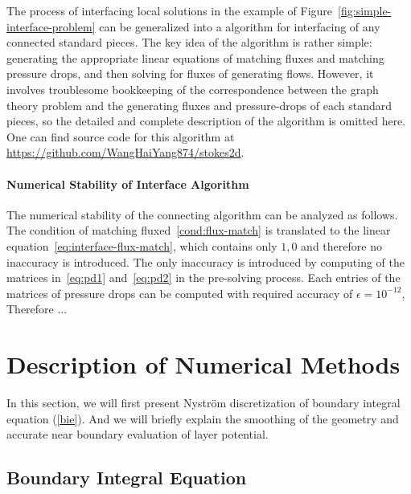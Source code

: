 \documentclass[10pt,twocolumn,letterpaper]{article}
\begin{document}
The process of interfacing local solutions in the example of Figure~\ref{fig:simple-interface-problem} 
can be generalized into a algorithm for interfacing of any connected standard pieces. 
The key idea of the algorithm is rather simple: 
generating the appropriate linear equations of matching fluxes and matching pressure drops,  
and then solving for fluxes of generating flows.
However, it involves troublesome bookkeeping of the correspondence between the graph theory problem 
and the generating fluxes and pressure-drops of each standard pieces, 
so the detailed and complete description of the algorithm is omitted here. 
One can find source code for this algorithm at \url{https://github.com/WangHaiYang874/stokes2d}. 

\paragraph{Numerical Stability of Interface Algorithm}
The numerical stability of the connecting algorithm can be analyzed as follows. 
The condition of matching fluxed~\ref{cond:flux-match} is translated to the linear equation~\eqref{eq:interface-flux-match},
which contains only $1,0$ and therefore no inaccuracy is introduced. 
The only inaccuracy is introduced by computing of the matrices in~\eqref{eq:pd1} and~\eqref{eq:pd2} in the pre-solving process. 
Each entries of the matrices of pressure drops can be computed with required accuracy of $\epsilon=10^{-12}$, Therefore ... 


\section{Description of Numerical Methods\label{sec:numericalmethod}}
In this section,
we will first present Nystr\"om discretization of boundary integral equation (\ref{bie}).
And we will briefly explain the smoothing of the geometry and accurate near boundary evaluation of layer potential.

\subsection{Boundary Integral Equation}
\end{document}
